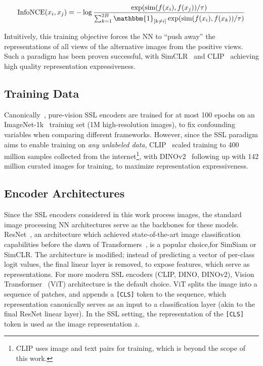 \begin{equation}
    \label{eq:infonce}
    \text{InfoNCE}(x_i,x_j)=-\log\frac{\exp(\text{sim}(f(x_i),f(x_j))/\tau)}{\sum_{k=1}^{2B}\mathbbm{1}_{[k\neq i]}\exp(\text{sim}(f(x_i),f(x_k))/\tau)}
\end{equation}

Intuitively, this training objective forces the NN to ``push away'' the representations of all views of the alternative images from the positive views. Such a paradigm has been proven successful, with SimCLR~\cite{simclr} and CLIP~\cite{clip} achieving high quality representation expressiveness.

\subsection{Training Data}

Canonically~\cite{simclr,dinov1,simsiam}, pure-vision SSL encoders are trained for at most 100 epochs on an ImageNet-1k~\cite{imagenet} training set (1M high-resolution images), to fix confounding variables when comparing different frameworks. However, since the SSL paradigm aims to enable training on \textit{any unlabeled data}, CLIP~\cite{clip} scaled training to 400 million samples collected from the internet\footnote{CLIP uses image and text pairs for training, which is beyond the scope of this work.}, with DINOv2~\cite{dinov2} following up with 142 million curated images for training, to maximize representation expressiveness.

\subsection{Encoder Architectures}

Since the SSL encoders considered in this work process images, the standard image processing NN architectures serve as the backbones for these models. ResNet~\cite{resnet}, an architecture which achieved state-of-the-art image classification capabilities before the dawn of Transformers~\cite{transformers}, is a popular choice,\eg for SimSiam or SimCLR. The architecture is modified; instead of predicting a vector of per-class logit values, the final linear layer is removed, to expose features, which serve as representations. For more modern SSL encoders (CLIP, DINO, DINOv2), Vision Transformer~\cite{vit} (ViT) architecture is the default choice. ViT splits the image into a sequence of patches, and appends a \texttt{[CLS]} token to the sequence, which representation canonically serves as an input to a classification layer (akin to the final ResNet linear layer). In the SSL setting, the representation of the \texttt{[CLS]} token is used as the image representation $z$.

